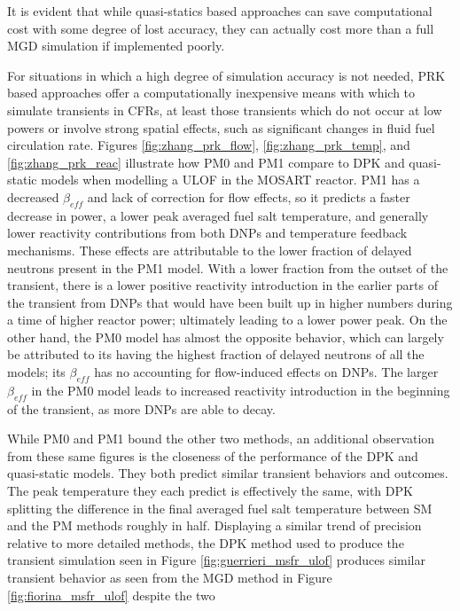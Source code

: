 \documentclass[review]{elsarticle}
\begin{document}
It is evident that while quasi-statics based approaches can save computational
 cost with some
degree of lost accuracy, they can actually cost more than
a full MGD simulation if implemented poorly.
\par For situations in which a high degree of simulation accuracy is not needed,
PRK based approaches offer a computationally inexpensive means with which to
simulate transients in CFRs, at least those transients which do not occur at
low powers or involve strong spatial effects, such as significant changes in
fluid fuel circulation rate.
Figures \ref{fig:zhang_prk_flow}, \ref{fig:zhang_prk_temp}, and 
\ref{fig:zhang_prk_reac} illustrate how PM0 and PM1
compare to DPK and quasi-static models when modelling a ULOF in
the MOSART reactor. PM1 has a decreased $\beta_{eff}$ and lack of correction
for flow effects, so it predicts a faster decrease in power, a lower
peak averaged fuel salt temperature, and generally lower reactivity
contributions from both DNPs and temperature feedback mechanisms. These
effects are attributable to the lower fraction of delayed neutrons present
in the PM1 model. With a lower fraction from the outset of the transient, there
is a lower positive reactivity introduction in the earlier parts of the
transient from DNPs that would have been built up in higher numbers during
a time of higher reactor power; ultimately leading to a lower power peak.
On the other hand, the PM0 model has almost
the opposite behavior, which can largely be attributed to its having the
highest fraction of delayed neutrons of all the models; its $\beta_{eff}$
has no accounting for flow-induced effects on DNPs. The larger
$\beta_{eff}$ in the PM0 model leads to increased reactivity introduction
in the beginning of the transient, as more DNPs are able to decay.
\par While PM0 and PM1 bound the other two methods, an additional observation
 from
these same figures is the closeness of the performance of the DPK and
quasi-static models. They both predict similar transient
behaviors and outcomes. The peak temperature they each predict is effectively
the same, with DPK splitting the difference in the final averaged fuel salt
temperature between SM and the PM methods roughly in half. Displaying
a similar trend of precision relative to more detailed methods, the DPK method
 used to produce
the transient simulation seen in Figure \ref{fig:guerrieri_msfr_ulof} \cite{guerrieri_investigation_2013}
produces similar transient
behavior as seen from the MGD method in Figure \ref{fig:fiorina_msfr_ulof} 
\cite{fiorina_modelling_2014} despite the two
\end{document}
